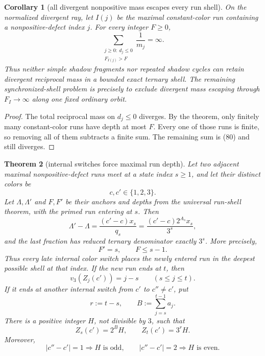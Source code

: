 \documentclass[11pt]{article}
\newtheorem{theorem}{Theorem}
\newtheorem{corollary}[theorem]{Corollary}
\begin{document}
\begin{corollary}[all divergent nonpositive mass escapes every run shell]
On the normalized divergent ray, let $I(j)$ be the maximal constant-color
run containing a nonpositive-defect index $j$.  For every integer $F\geq0$,
\[
\boxed{
  \sum_{\substack{j\geq0:\ d_j\leq0\\F_{I(j)}>F}}
  \frac1{m_j}=\infty.}
\tag{80}
\]
Thus neither simple shadow fragments nor repeated shadow cycles can retain
divergent reciprocal mass in a bounded exact ternary shell.  The remaining
synchronized-shell problem is precisely to exclude divergent mass escaping
through $F_I\to\infty$ along one fixed ordinary orbit.
\end{corollary}

\begin{proof}
The total reciprocal mass on $d_j\leq0$ diverges.  By the theorem, only
finitely many constant-color runs have depth at most $F$.  Every one of
those runs is finite, so removing all of them subtracts a finite sum.  The
remaining sum is (80) and still diverges.
\end{proof}

\begin{theorem}[internal switches force maximal run depth]
Let two adjacent maximal nonpositive-defect runs meet at a state index
$s\geq1$, and let their distinct colors be
\[
  c,c'\in\{1,2,3\}.
  \tag{81}
\]
Let $\Lambda,\Lambda'$ and $F,F'$ be their anchors and depths from the
universal run-shell theorem, with the primed run entering at $s$.  Then
\[
\boxed{
  \Lambda'-\Lambda
  =\frac{(c'-c)x_s}{q_s}
  =\frac{(c'-c)2^{A_s}x_s}{3^s},}
\tag{82}
\]
and the last fraction has reduced ternary denominator exactly $3^s$.
More precisely,
\[
\boxed{F' =s,
\qquad F\leq s-1.}
\tag{83}
\]
Thus every late internal color switch places the newly entered run in the
deepest possible shell at that index.  If the new run ends at $t$, then
\[
\boxed{
  v_3(Z_j(c'))=j-s
  \qquad(s\leq j\leq t).}
\tag{83a}
\]
If it ends at another internal switch from $c'$ to $c''\neq c'$, put
\[
  r:=t-s,
  \qquad
  B:=\sum_{j=s}^{t-1}a_j.
\]
There is a positive integer $H$, not divisible by $3$, such that
\[
\boxed{
  Z_s(c')=2^BH,
  \qquad
  Z_t(c')=3^rH.}
\tag{83b}
\]
Moreover,
\[
  |c''-c'|=1\Longrightarrow H\text{ is odd},
  \qquad
  |c''-c'|=2\Longrightarrow H\text{ is even}.
\tag{83c}
\]
\end{theorem}
\end{document}
